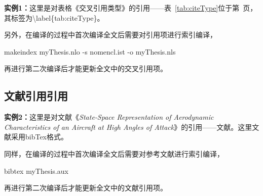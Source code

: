 {\bf{实例1：}}这里是对表格《交叉引用类型》的引用——表~\ref{tab:citeType}位于第~\pageref{tab:citeType}页，其标签为\textbackslash label\{tab:citeType\}。

另外，在编译的过程中首次编译全文后需要对引用项进行索引编译，

\begin{center}
  {\color{blue}makeindex myThesis.nlo -s nomencl.ist -o myThesis.nls}
\end{center}

再进行第二次编译后才能更新全文中的交叉引用项。

\subsection{文献引用引用}
{\bf{实例2：}}这里是对文献《{\it{State-Space Representation of Aerodynamic Characteristics of an Aircraft at High Angles of Attack}}》的引用——文献\cite{Goman:state_aerodynamics}。这里文献采用bibTex格式。

同样，在编译的过程中首次编译全文后需要对参考文献进行索引编译，

\begin{center}
  {\color{blue}bibtex myThesis.aux}
\end{center}

再进行第二次编译后才能更新全文中的文献引用项。
